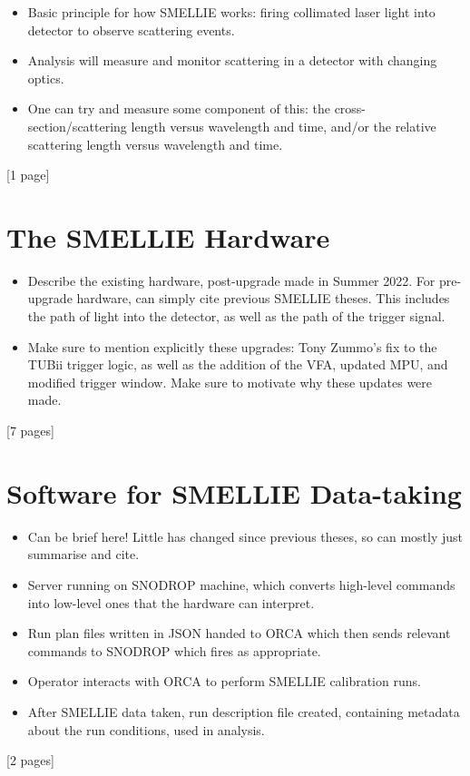 {
    \color{blue}

\begin{itemize}
    \item Basic principle for how SMELLIE works: firing collimated laser light into detector to observe scattering events.
    \item Analysis will measure and monitor scattering in a detector with changing optics.
    \item One can try and measure some component of this: the cross-section/scattering length versus wavelength and time, and/or the relative scattering length versus wavelength and time.
\end{itemize}
[1 page]
\section{The SMELLIE Hardware}
\begin{itemize}
    \item Describe the existing hardware, post-upgrade made in Summer 2022. For pre-upgrade hardware, can simply cite previous SMELLIE theses. This includes the path of light into the detector, as well as the path of the trigger signal.
    \item Make sure to mention explicitly these upgrades: Tony Zummo's fix to the TUBii trigger logic, as well as the addition of the VFA, updated MPU, and modified trigger window. Make sure to motivate why these updates were made.
\end{itemize}
[7 pages]
\section{Software for SMELLIE Data-taking}
\begin{itemize}
    \item Can be brief here! Little has changed since previous theses, so can mostly just summarise and cite.
    \item Server running on SNODROP machine, which converts high-level commands into low-level ones that the hardware can interpret.
    \item Run plan files written in JSON handed to ORCA which then sends relevant commands to SNODROP which fires as appropriate.
    \item Operator interacts with ORCA to perform SMELLIE calibration runs.
    \item After SMELLIE data taken, run description file created, containing metadata about the run conditions, used in analysis.
\end{itemize}
[2 pages]
}
